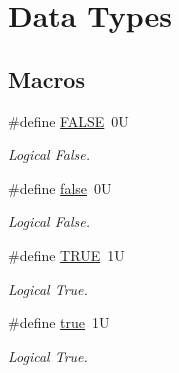 \hypertarget{group__data__types}{\section{Data Types}
\label{group__data__types}
}
\subsection*{Macros}
\begin{DoxyCompactItemize}
\item 
\hypertarget{group__data__types_gaa93f0eb578d23995850d61f7d61c55c1}{\#define \hyperlink{group__data__types_gaa93f0eb578d23995850d61f7d61c55c1}{F\-A\-L\-S\-E}~0\-U}\label{group__data__types_gaa93f0eb578d23995850d61f7d61c55c1}

\begin{DoxyCompactList}\small\item\em Logical False. \end{DoxyCompactList}\item 
\hypertarget{group__data__types_ga65e9886d74aaee76545e83dd09011727}{\#define \hyperlink{group__data__types_ga65e9886d74aaee76545e83dd09011727}{false}~0\-U}\label{group__data__types_ga65e9886d74aaee76545e83dd09011727}

\begin{DoxyCompactList}\small\item\em Logical False. \end{DoxyCompactList}\item 
\hypertarget{group__data__types_gaa8cecfc5c5c054d2875c03e77b7be15d}{\#define \hyperlink{group__data__types_gaa8cecfc5c5c054d2875c03e77b7be15d}{T\-R\-U\-E}~1\-U}\label{group__data__types_gaa8cecfc5c5c054d2875c03e77b7be15d}

\begin{DoxyCompactList}\small\item\em Logical True. \end{DoxyCompactList}\item 
\hypertarget{group__data__types_ga41f9c5fb8b08eb5dc3edce4dcb37fee7}{\#define \hyperlink{group__data__types_ga41f9c5fb8b08eb5dc3edce4dcb37fee7}{true}~1\-U}\label{group__data__types_ga41f9c5fb8b08eb5dc3edce4dcb37fee7}

\begin{DoxyCompactList}\small\item\em Logical True. \end{DoxyCompactList}\end{DoxyCompactItemize}
